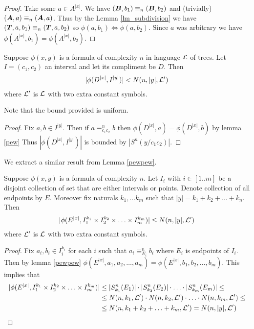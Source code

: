 \documentclass{amsart}
\DeclareMathOperator{\TT}{\boldface T}
\DeclareMathOperator{\A}{\boldface A}
\DeclareMathOperator{\B}{\boldface B}
\begin{document}
\begin{proof}
	Take some $a \in A^{|x|}$. We have $(\B, b_1) \equiv_n (\B, b_2)$ and (trivially) $(\A, a) \equiv_n (\A, a)$. Thus by the Lemma \ref{lm_subdivision} we have $(\TT, a, b_1) \equiv_n (\TT, a, b_2)$ so $\phi(a, b_1) \iff \phi(a, b_2)$. Since $a$ was arbitrary we have $\phi(A^{|x|}, b_1) = \phi(A^{|x|}, b_2)$.
\end{proof}

\begin{Lemma}
	Suppose $\phi(x,y)$ is a formula of complexity $n$ in language $\mathcal L$ of trees. Let $I = (c_1, c_2)$ an interval and let its compliment be $D$. Then  
	\begin{align*}
		|\phi(D^{|x|}, I^{|y|})| < N(n, |y|, \mathcal L')
	\end{align*}
	where $\mathcal L'$ is $\mathcal L$ with two extra constant symbols.
\end{Lemma}

Note that the bound provided is uniform.

\begin{proof}
	Fix $a, b \in I^{|y|}$. Then if $a \equiv^n_{c_1c_2} b$ then $\phi(D^{|x|}, a) = \phi(D^{|x|}, b)$ by lemma \ref{pew} Thus $|\phi(D^{|x|}, I^{|y|})|$ is bounded by $|S^n(y/c_1c_2)|$.
\end{proof}

We extract a similar result from Lemma \ref{pewpew}.

\begin{Lemma}
	Suppose $\phi(x,y)$ is a formula of complexity $n$. Let $I_i$ with $i \in [1..m]$ be a disjoint collection of set that are either intervals or points. Denote collection of all endpoints by $E$. Moreover fix naturals $k_1, \ldots k_m$ such that $|y| = k_1 + k_2 + \ldots + k_n$. Then
	\begin{align*}
		|\phi(E^{|x|}, I_1^{k_1} \times I_2^{k_2} \times \ldots \times I_m^{k_m})| \leq N(n, |y|, \mathcal L')
	\end{align*}
	where $\mathcal L'$ is $\mathcal L$ with two extra constant symbols.
\end{Lemma}

\begin{proof}
	Fix $a_i, b_i \in I_i^{k_i}$ for each $i$ such that $a_i \equiv^n_{E_i} b_i$ where $E_i$ is endpoints of $I_i$. Then by lemma \ref{pewpew} $\phi(E^{|x|}, a_1, a_2, \ldots, a_m) = \phi(E^{|x|}, b_1, b_2, \ldots, b_m)$. This implies that
	\begin{align*}
		|\phi(E^{|x|}, I_1^{k_1} \times I_2^{k_2} \times \ldots \times I_m^{k_m})|
		&\leq |S^n_{k_1}(E_1)| \cdot |S^n_{k_2}(E_2)| \cdot \ldots \cdot |S^n_{k_m}(E_m)| \leq \\
		&\leq N(n, k_1, \mathcal L') \cdot N(n, k_2, \mathcal L') \cdot \ldots \cdot N(n, k_m, \mathcal L')  \leq \\
		&\leq N(n, k_1 + k_2 + \ldots + k_m, \mathcal L') = N(n, |y|, \mathcal L')
	\end{align*}
\end{proof}
\end{document}
